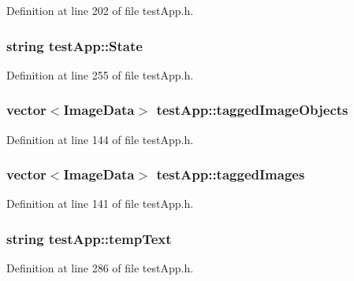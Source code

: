 Definition at line 202 of file test\-App.\-h.

\hypertarget{classtest_app_a8ce5505df4526abed238956b65956edd}{
\subsubsection[{State}]{\setlength{\rightskip}{0pt plus 5cm}string test\-App\-::\-State}}\label{classtest_app_a8ce5505df4526abed238956b65956edd}


Definition at line 255 of file test\-App.\-h.

\hypertarget{classtest_app_af65c8dc2f4620bfe7fdf6a39043cb48d}{
\subsubsection[{tagged\-Image\-Objects}]{\setlength{\rightskip}{0pt plus 5cm}vector$<${\bf Image\-Data}$>$ test\-App\-::tagged\-Image\-Objects}}\label{classtest_app_af65c8dc2f4620bfe7fdf6a39043cb48d}


Definition at line 144 of file test\-App.\-h.

\hypertarget{classtest_app_a7f7226fc54fdb7d06366ed0fa3ab7ee3}{
\subsubsection[{tagged\-Images}]{\setlength{\rightskip}{0pt plus 5cm}vector$<${\bf Image\-Data}$>$ test\-App\-::tagged\-Images}}\label{classtest_app_a7f7226fc54fdb7d06366ed0fa3ab7ee3}


Definition at line 141 of file test\-App.\-h.

\hypertarget{classtest_app_ad9a4beab6f2e0f13d32b00b502e89bdc}{
\subsubsection[{temp\-Text}]{\setlength{\rightskip}{0pt plus 5cm}string test\-App\-::temp\-Text}}\label{classtest_app_ad9a4beab6f2e0f13d32b00b502e89bdc}


Definition at line 286 of file test\-App.\-h.

